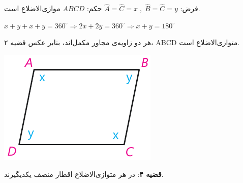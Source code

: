 \documentclass[12pt, a4paper]{book}
\begin{document}
\begin{minipage}{.68\textwidth}
	\centering فرض: 
	$
		\widehat{A} = \widehat{C} = x \; , \; \widehat{B} = \widehat{C} = y
	$
	\qquad حکم:
	$ 
		ABCD 
	$ موازی‌الاضلاع است.
	\begin{flushleft}
		$ 
			x+y +x +y = 360^{\circ} \Rightarrow 2x + 2y = 360^{\circ} \Rightarrow x+y =180^{\circ}
		$
	\end{flushleft}
		هر دو زاویه‌ی مجاور مکمل‌اند،  بنابر عکس قضیه‌ ۲، ABCD متوازی‌الاضلاع است.
\end{minipage}
\begin{minipage}{.28\textwidth}
	\begin{flushleft}
		\includegraphics{"Shapes/Fasl - 3/Dars 1/qazie 3 ax.pdf"}
	\end{flushleft}
\end{minipage}
\newpage

\textbf{قضیه ۴}: در هر متوازی‌الاضلاع اقطار منصف یکدیگیرند.
\end{document}
